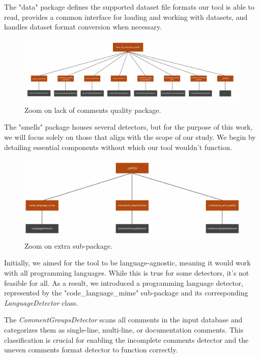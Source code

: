 \noindent The "data" package defines the supported dataset file formats our tool is able to read, provides a common interface for loading and working with datasets, and handles dataset format conversion when necessary.

\newpage
	
\begin{figure}[ht]
	\centering\includegraphics[width=465pt]{figs/zoom-cmsquality.PNG}
	\captionsetup{justification=centering}
	\caption{Zoom on lack of comments quality package.}
	\label{fig:zoom-cmsquality}
\end{figure}
	
\noindent The "smells" package houses several detectors, but for the purpose of this work, we will focus solely on those that align with the scope of our study. We begin by detailing essential components without which our tool wouldn't function.

\begin{figure}[ht]
	\centering\includegraphics[width=400pt]{figs/zoom-extra.PNG}
	\captionsetup{justification=centering}
	\caption{Zoom on extra sub-package.}
	\label{fig:zoom-extra}
\end{figure}

\noindent Initially, we aimed for the tool to be language-agnostic, meaning it would work with all programming languages. While this is true for some detectors, it’s not feasible for all. As a result, we introduced a programming language detector, represented by the "code\_language\_mime" sub-package and its corresponding \textit{LanguageDetector} class.

\noindent The \textit{CommentGroupsDetector} scans all comments in the input database and categorizes them as single-line, multi-line, or documentation comments. This classification is crucial for enabling the incomplete comments detector and the uneven comments format detector to function correctly.

